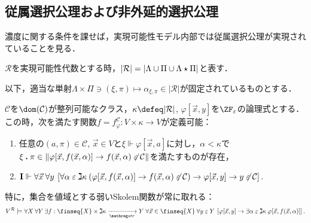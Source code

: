 \documentclass[realisability.tex]{subfiles}
\begin{document}
\subsection{従属選択公理および非外延的選択公理}
濃度に関する条件を課せば，実現可能性モデル内部では従属選択公理が実現されていることを見る．
\begin{definition}
 $\mathcal{R}$を実現可能性代数とする時，$|\mathcal{R}| = \left\lvert\Lambda \cup \Pi \cup \Lambda \mathbin{\star} \Pi\right\rvert$と表す．

 以下，適当な単射$\Lambda \times \Pi \ni (\xi, \pi) \mapsto \alpha_{\xi,\pi} \in |\mathcal{R}|$が固定されているものとする．
\end{definition}

\begin{lemma}\label{lem:weak-skolem-gen}
 $\mathcal{C}$を$\dom(\mathcal{C})$が整列可能なクラス，$\kappa \defeq |\mathcal{R}|$, $\varphi[\vec{x}, y]$を$\ZF_{\varepsilon}$の論理式とする．
 この時，次を満たす関数$f = f^{\mathcal{C}}_{\varphi}: V \times \kappa \to V$が定義可能：
 \begin{enumerate}
  \item \label{item:sk-hered}任意の$(a, \pi) \in \mathcal{C}$, $\vec{x} \in V$と$\xi \Vdash \varphi[\vec{x}, a]$に対し，$\alpha < \kappa$で$\xi \mathbin{\boldsymbol{.}} \pi \in \|\varphi[\vec{x}, f(\vec{x}, \alpha)] \to f(\vec{x}, \alpha) \not\mathrel{\varepsilon} \mathcal{C}\|$を満たすものが存在，
  \item $\mathsf{\mathbf{I}} \Vdash \forall \vec{x} \: \forall y \:\left[ \forall \alpha \mathrel{\varepsilon} \gimel \kappa\: (\varphi[\vec{x}, f(\vec{x}, \alpha)] \to f(\vec{x},\alpha) \not\mathrel{\varepsilon} \mathcal{C}) \to \varphi[\vec{x}, y] \to y \not\mathrel{\varepsilon} \mathcal{C} \right]$. 
 \end{enumerate}
 特に，集合を値域とする弱いSkolem関数が常に取れる：
 \[
 V^{\mathcal{R}} \models \forall X\: \forall Y \: \exists f: \finseq{X} \times \gimel \kappa \strto Y\; \forall \vec{x} \in \finseq{X} \:\forall y \strin Y \: 
  \left[\varphi[\vec{x}, y] \to \exists \alpha \strin \gimel \kappa \: \varphi[\vec{x}, f(\vec{x}, \alpha)]\right].
 \]
\end{lemma}
\end{document}
